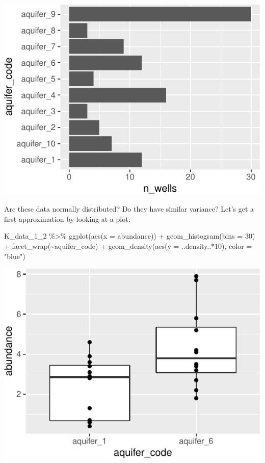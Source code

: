 \documentclass[
]{krantz}
\newenvironment{Shaded}{\begin{snugshade}}{\end{snugshade}}
\newcommand{\AttributeTok}[1]{\textcolor[rgb]{0.77,0.63,0.00}{#1}}
\newcommand{\DecValTok}[1]{\textcolor[rgb]{0.00,0.00,0.81}{#1}}
\newcommand{\FunctionTok}[1]{\textcolor[rgb]{0.00,0.00,0.00}{#1}}
\newcommand{\NormalTok}[1]{#1}
\newcommand{\SpecialCharTok}[1]{\textcolor[rgb]{0.00,0.00,0.00}{#1}}
\newcommand{\StringTok}[1]{\textcolor[rgb]{0.31,0.60,0.02}{#1}}
\begin{document}
\begin{center}\includegraphics{index_files/figure-latex/unnamed-chunk-136-1} \end{center}

Are these data normally distributed? Do they have similar variance? Let's get a first approximation by looking at a plot:

\begin{Shaded}
\begin{Highlighting}[]
\NormalTok{K\_data\_1\_2 }\SpecialCharTok{\%\textgreater{}\%}
  \FunctionTok{ggplot}\NormalTok{(}\FunctionTok{aes}\NormalTok{(}\AttributeTok{x =}\NormalTok{ abundance)) }\SpecialCharTok{+} 
    \FunctionTok{geom\_histogram}\NormalTok{(}\AttributeTok{bins =} \DecValTok{30}\NormalTok{) }\SpecialCharTok{+}
    \FunctionTok{facet\_wrap}\NormalTok{(}\SpecialCharTok{\textasciitilde{}}\NormalTok{aquifer\_code) }\SpecialCharTok{+}
    \FunctionTok{geom\_density}\NormalTok{(}\FunctionTok{aes}\NormalTok{(}\AttributeTok{y =}\NormalTok{ ..density..}\SpecialCharTok{*}\DecValTok{10}\NormalTok{), }\AttributeTok{color =} \StringTok{"blue"}\NormalTok{)}
\end{Highlighting}
\end{Shaded}

\begin{center}\includegraphics{index_files/figure-latex/unnamed-chunk-137-1} \end{center}
\end{document}
